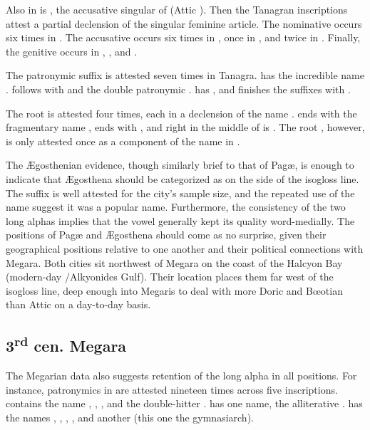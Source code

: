 Also in  is , the accusative singular of  (Attic ).
Then the Tanagran inscriptions attest a partial declension of the singular feminine article.
The nominative  occurs six times in .
The accusative  occurs six times in ,
once in ,
and twice in .
Finally,
the genitive  occurs in ,
,
and .

The patronymic suffix  is attested seven times in Tanagra.
 has the incredible name .
 follows with  and the double patronymic .
 has , and  finishes the suffixes with .

The root  is attested four times,
each in a declension of the name .
 ends with the fragmentary name ,
 ends with ,
and right in the middle of  is .
The root ,
however,
is only attested once as a component of the name  in .

The Ægosthenian evidence,
though similarly brief to that of Pagæ,
is enough to indicate that Ægosthena should be categorized as on the  side of the isogloss line.
The suffix  is well attested for the city's sample size,
and the repeated use of the name  suggest it was a popular name.
Furthermore,
the consistency of the two long alphas implies that the vowel generally kept its quality word-medially.
The positions of Pagæ and Ægosthena should come as no surprise, given their geographical positions relative to one another
and their political connections with Megara.
Both cities sit northwest of Megara on the coast of the Halcyon Bay (modern-day /Alkyonides Gulf).
Their location places them far west of the isogloss line,
deep enough into Megaris to deal with more Doric and Bœotian than Attic on a day-to-day basis.

\subsection{3\textsuperscript{rd} cen.  Megara}
The Megarian data also suggests retention of the long alpha in all positions. 
For instance, patronymics in  are attested nineteen times across five inscriptions.
 contains the name ,
,
,
and the double-hitter .
 has one name,
the alliterative .
 has the names ,
,
,
,
and another  (this one the gymnasiarch). 

